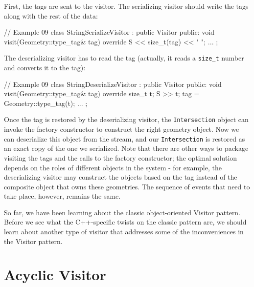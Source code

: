 First, the tags are sent to the visitor. The serializing visitor should write the tags along with the rest of the data:

\begin{code}
// Example 09
class StringSerializeVisitor : public Visitor {
  public:
  void visit(Geometry::type_tag& tag) override {
    S << size_t(tag) << " ";
  }
  ...
};
\end{code}

The deserializing visitor has to read the tag (actually, it reads a \texttt{size\_t} number and converts it to the tag):

\begin{code}
// Example 09
class StringDeserializeVisitor : public Visitor {
  public:
  void visit(Geometry::type_tag& tag) override {
    size_t t;
    S >> t;
    tag = Geometry::type_tag(t);
  }
  ...
};
\end{code}

Once the tag is restored by the deserializing visitor, the \texttt{Intersection} object can invoke the factory constructor to construct the right geometry object. Now we can deserialize this object from the stream, and our \texttt{Intersection} is restored as an exact copy of the one we serialized. Note that there are other ways to package visiting the tags and the calls to the factory constructor; the optimal solution depends on the roles of different objects in the system - for example, the deserializing visitor may construct the objects based on the tag instead of the composite object that owns these geometries. The sequence of events that need to take place, however, remains the same.

So far, we have been learning about the classic object-oriented Visitor pattern. Before we see what the C++-specific twists on the classic pattern are, we should learn about another type of visitor that addresses some of the inconveniences in the Visitor pattern.

\section{Acyclic Visitor}

